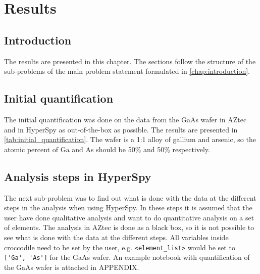 \chapter{Results}

\section{Introduction}
\label{sec:results:intro}
The results are presented in this chapter.
The sections follow the structure of the sub-problems of the main problem statement formulated in \cref{chap:introduction}.

%
%
\section{Initial quantification}
\label{sec:results:initial_quantification}

The initial quantification was done on the data from the GaAs wafer in AZtec and in HyperSpy as out-of-the-box as possible.
The results are presented in \cref{tab:initial_quantification}.
The wafer is a 1:1 alloy of gallium and arsenic, so the atomic percent of Ga and As should be 50\% and 50\% respectively.



%
%
\section{Analysis steps in HyperSpy}
\label{sec:results:steps}

The next sub-problem was to find out what is done with the data at the different steps in the analysis when using HyperSpy.
In these steps it is assumed that the user have done qualitative analysis and want to do quantitative analysis on a set of elements.
The analysis in AZtec is done as a black box, so it is not possible to see what is done with the data at the different steps.
All variables inside croccodile need to be set by the user, e.g. \verb|<element_list>| would be set to \verb|['Ga', 'As']| for the GaAs wafer.
An example notebook with quantification of the GaAs wafer is attached in APPENDIX.

